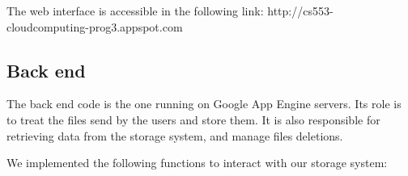 \documentclass{article}
\begin{document}
The web interface is accessible in the following link: http://cs553-cloudcomputing-prog3.appspot.com



\subsection{Back end}

The back end code is the one running on Google App Engine servers. Its role is to treat the files send by the users and store them. It is also responsible for retrieving data from the storage system, and manage files deletions.





We implemented the following functions to interact with our storage system:
\end{document}
